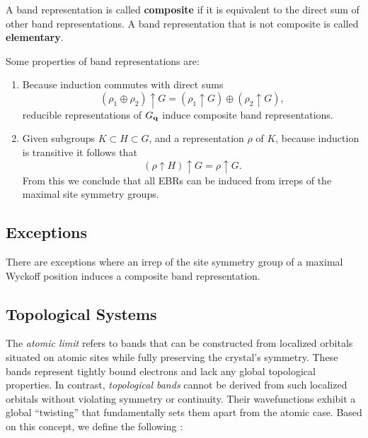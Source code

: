 \begin{definition}
A band representation is called \textbf{composite} if it is equivalent to the direct sum of other band representations. A band representation that is not composite is called \textbf{elementary}.
\end{definition}

\begin{theorem}
Some properties of band representations are:
\begin{enumerate}
\item Because induction commutes with direct sums
$$
(\rho_1 \oplus \rho_2) \uparrow G = (\rho_1 \uparrow G) \oplus (\rho_2 \uparrow G),
$$
reducible representations of $G_{\vb{q}}$ induce composite band representations.

\item Given subgroups $K \subset H \subset G$, and a representation $\rho$ of $K$, because induction is transitive it follows that
$$
(\rho \uparrow H) \uparrow G = \rho \uparrow G.
$$
From this we conclude that all EBRs can be induced from irreps of the maximal site symmetry groups.
\end{enumerate}
\end{theorem}

\subsection{Exceptions}

There are exceptions where an irrep of the site symmetry group of a maximal Wyckoff position induces a composite band representation.

\subsection{Topological Systems}

The \textit{atomic limit} refers to bands that can be constructed from localized orbitals situated on atomic sites while fully preserving the crystal's symmetry. These bands represent tightly bound electrons and lack any global topological properties. In contrast, \textit{topological bands} cannot be derived from such localized orbitals without violating symmetry or continuity. Their wavefunctions exhibit a global ``twisting'' that fundamentally sets them apart from the atomic case. Based on this concept, we define the following \cite{building_blocks2018}:

